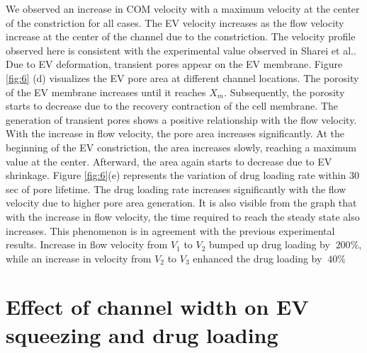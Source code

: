 We observed an increase in COM velocity with a maximum velocity at the center of the constriction for all cases. The EV velocity increases as the flow velocity increase at the center of the channel due to the constriction. The velocity profile observed here is consistent with the experimental value observed in Sharei et al.\cite{a64,a67,a70}. Due to EV deformation, transient pores appear on the EV membrane. Figure \ref{fig:6} (d) visualizes the EV pore area at different channel locations. The porosity of the EV membrane increases until it reaches $X_m$. Subsequently, the porosity starts to decrease due to the recovery contraction of the cell membrane. The generation of transient pores shows a positive relationship with the flow velocity. With the increase in flow velocity, the pore area increases significantly. At the beginning of the EV constriction, the area increases slowly, reaching a maximum value at the center. Afterward, the area again starts to decrease due to EV shrinkage. Figure \ref{fig:6}(e) represents the variation of drug loading rate within 30 sec of pore lifetime. The drug loading rate increases significantly with the flow velocity due to higher pore area generation. It is also visible from the graph that with the increase in flow velocity, the time required to reach the steady state also increases. This phenomenon is in agreement with the previous experimental results\cite{a64,a67}. Increase in flow velocity from $V_1$ to $V_2$ bumped up drug loading by $~200\%$, while an increase in velocity from $V_2$ to $V_3$ enhanced the drug loading by $~40\%$

\section{Effect of channel width on EV squeezing and drug loading}

